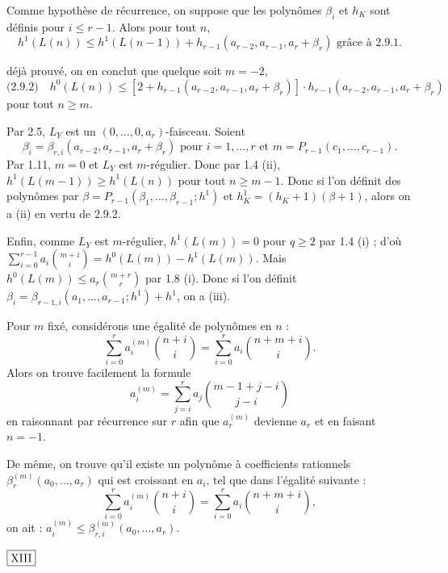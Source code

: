 Comme hypothèse de récurrence, on suppose que les polynômes $\beta_i$ et $h_K$ sont définis pour $i \leq r-1$. Alors pour tout $n$,
\[
h^1(L(n)) \leq h^1(L(n-1)) + h_{r-1}(a_{r-2}, a_{r-1}, a_r + \beta_r) \text{ grâce à 2.9.1.}
\]

\noindent
déjà prouvé, on en conclut que quelque soit $m = -2$,
\[
\text{(2.9.2)} \quad h^0(L(n)) \leq [2 + h_{r-1}(a_{r-2}, a_{r-1}, a_r + \beta_r)] \cdot h_{r-1}(a_{r-2}, a_{r-1}, a_r + \beta_r)
\]
pour tout $n \geq m$.

Par 2.5, $L_Y$ est un $(0, \ldots, 0, a_r)$-faisceau. Soient
\[
\beta_i = \beta_{r,i}(a_{r-2}, a_{r-1}, a_r + \beta_r) \text{ pour } i=1,\ldots,r \text{ et } m = P_{r-1}(c_1, \ldots, c_{r-1}).
\]
Par 1.11, $m=0$ et $L_Y$ est $m$-régulier. Donc par 1.4 (ii), $h^1(L(m-1)) \geq h^1(L(n))$ pour tout $n \geq m-1$. Donc si l'on définit des polynômes par $\beta = P_{r-1}(\beta_1, \ldots, \beta_{r-1}; h^1)$ et $h^1_K = (h_K + 1)(\beta + 1)$, alors on a (ii) en vertu de 2.9.2.

Enfin, comme $L_Y$ est $m$-régulier, $h^1(L(m)) = 0$ pour $q \geq 2$ par 1.4 (i) ; d'où $\sum_{i=0}^{r-1} a_i \binom{m+i}{i} = h^0(L(m)) - h^1(L(m))$. Mais $h^0(L(m)) \leq a_r \binom{m+r}{r}$ par 1.8 (i). Donc si l'on définit $\beta_i = \beta_{r-1,i}(a_1, \ldots, a_{r-1}; h^1) + h^1$, on a (iii).

\begin{rem}\label{rem:2.10} Pour $m$ fixé, considérons une égalité de polynômes en $n$ :
\[
\sum_{i=0}^{r} a_i^{(m)} \binom{n+i}{i} = \sum_{i=0}^{r} a_i \binom{n+m+i}{i}.
\]
Alors on trouve facilement la formule
\[
a_i^{(m)} = \sum_{j=i}^{r} a_j \binom{m-1+j-i}{j-i}
\]
en raisonnant par récurrence sur $r$ afin que $a_r^{(m)}$ devienne $a_r$ et en faisant $n = -1$.

De même, on trouve qu'il existe un polynôme à coefficients rationnels $\beta_r^{(m)}(a_0, \ldots, a_r)$ qui est croissant en $a_i$, tel que dans l'égalité suivante :
\[
\sum_{i=0}^{r} a_i^{(m)} \binom{n+i}{i} = \sum_{i=0}^{r} a_i \binom{n+m+i}{i},
\]
on ait : $a_i^{(m)} \leq \beta_{r,i}^{(m)}(a_0, \ldots, a_r)$.
\end{rem}

\begin{flushright}
$\fbox{\text{XIII}}$
\end{flushright}

